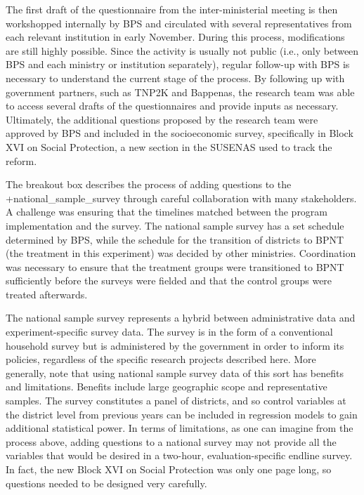 \documentclass[
]{book}
\begin{document}
\begin{bbox}
The first draft of the questionnaire from the inter-ministerial meeting is then workshopped internally by BPS and circulated with several representatives from each relevant institution in early November. During this process, modifications are still highly possible. Since the activity is usually not public (i.e., only between BPS and each ministry or institution separately), regular follow-up with BPS is necessary to understand the current stage of the process. By following up with government partners, such as TNP2K and Bappenas, the research team was able to access several drafts of the questionnaires and provide inputs as necessary. Ultimately, the additional questions proposed by the research team were approved by BPS and included in the socioeconomic survey, specifically in Block XVI on Social Protection, a new section in the SUSENAS used to track the reform.

\end{bbox}

The breakout box describes the process of adding questions to the +national\_sample\_survey\textbar{} through careful collaboration with many stakeholders. A challenge was ensuring that the timelines matched between the program implementation and the survey. The national sample survey has a set schedule determined by BPS, while the schedule for the transition of districts to BPNT (the treatment in this experiment) was decided by other ministries. Coordination was necessary to ensure that the treatment groups were transitioned to BPNT sufficiently before the surveys were fielded and that the control groups were treated afterwards.

The national sample survey represents a hybrid between administrative data and experiment-specific survey data. The survey is in the form of a conventional household survey but is administered by the government in order to inform its policies, regardless of the specific research projects described here. More generally, note that using national sample survey data of this sort has benefits and limitations. Benefits include large geographic scope and representative samples. The survey constitutes a panel of districts, and so control variables at the district level from previous years can be included in regression models to gain additional statistical power. In terms of limitations, as one can imagine from the process above, adding questions to a national survey may not provide all the variables that would be desired in a two-hour, evaluation-specific endline survey. In fact, the new Block XVI on Social Protection was only one page long, so questions needed to be designed very carefully.
\end{document}
